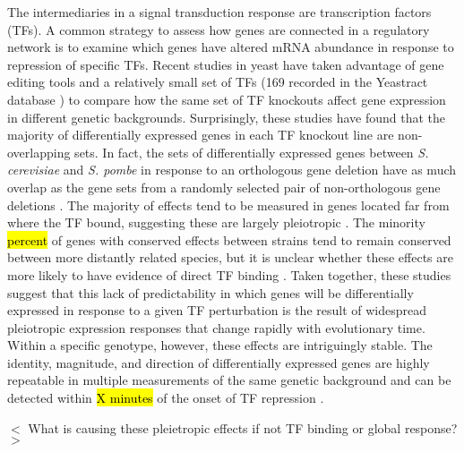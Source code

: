 The intermediaries in a signal transduction response are transcription factors (TFs). A common strategy to assess how genes are connected in a regulatory network is to examine which genes have altered mRNA abundance in response to repression of specific TFs. Recent studies in yeast have taken advantage of gene editing tools and a relatively small set of TFs (169 recorded in the Yeastract database \cite{Hahn2011}) to compare how the same set of TF knockouts affect gene expression in different genetic backgrounds. Surprisingly, these studies have found that the majority of differentially expressed genes in each TF knockout line are non-overlapping sets. In fact, the sets of differentially expressed genes between \textit{S. cerevisiae} and \textit{S. pombe} in response to an orthologous gene deletion have as much overlap as the gene sets from a randomly selected pair of non-orthologous gene deletions \cite{Li2025}. The majority of effects tend to be measured in genes located far from where the TF bound, suggesting these are largely pleiotropic \cite{Mahendrawada2025}. The minority \hl{percent} of genes with conserved effects between strains tend to remain conserved between more distantly related species, but it is unclear whether these effects are more likely to have evidence of direct TF binding \cite{Liu2024}. Taken together, these studies suggest that this lack of predictability in which genes will be differentially expressed in response to a given TF perturbation is the result of widespread pleiotropic expression responses that change rapidly with evolutionary time. Within a specific genotype, however, these effects are intriguingly stable. The identity, magnitude, and direction of differentially expressed genes are highly repeatable in multiple measurements of the same genetic background and can be detected within \hl{X minutes} of the onset of TF repression \cite{Mahendrawada2025}.

$<$ What is causing these pleietropic effects if not TF binding or global response? $>$

